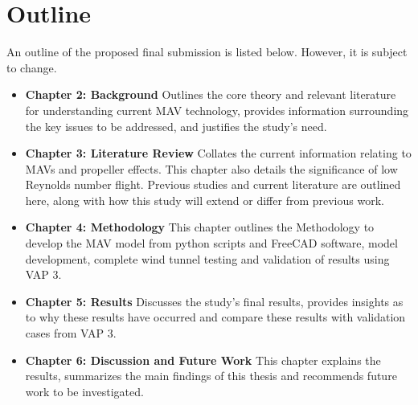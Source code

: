 \section{Outline}
\label{sec:Outline}
An outline of the proposed final submission is listed below. However, it is subject to change.

\begin{itemize}
  \item \textbf{Chapter 2: Background }\newline  Outlines the core theory and relevant literature for understanding current MAV technology, provides information surrounding the key issues to be addressed, and justifies the study's need. 
  \item \textbf{Chapter 3: Literature Review} \newline
  Collates the current information relating to MAVs and propeller effects. This chapter also details the significance of low Reynolds number flight. Previous studies and current literature are outlined here, along with how this study will extend or differ from previous work.
  \item \textbf{Chapter 4: Methodology} \newline This chapter outlines the Methodology to develop the MAV model from python scripts and FreeCAD software, model development, complete wind tunnel testing and validation of results using VAP 3.
  \item \textbf{Chapter 5: Results} \newline Discusses the study's final results, provides insights as to why these results have occurred and compare these results with validation cases from VAP 3.
  \item \textbf{Chapter 6: Discussion and Future Work} \newline This chapter explains the results, summarizes the main findings of this thesis and recommends future work to be investigated. 
\end{itemize}





